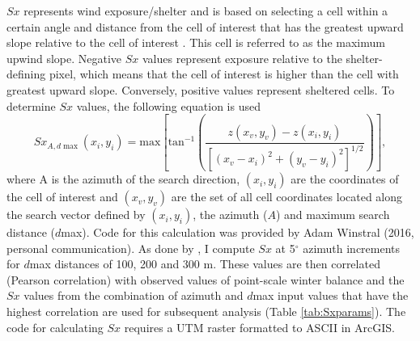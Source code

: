 \documentclass{sfuthesis}
\begin{document}
$Sx$ represents wind exposure/shelter and is based on selecting a cell within a certain angle and distance from the cell of interest that has the greatest upward slope relative to the cell of interest \citep{Winstral2002}. This cell is referred to as the maximum upwind slope. Negative $Sx$ values represent exposure relative to the shelter-defining pixel, which means that the cell of interest is higher than the cell with greatest upward slope. Conversely, positive values represent sheltered cells. To determine $Sx$ values, the following equation is used
\begin{equation}
Sx_{A, d\max}(x_i, y_i) = \textrm{max} \left[ \textrm{tan}^{-1} \left( \frac{z(x_v,y_v)-z(x_i,y_i)}{[(x_v-x_i)^2+(y_v-y_i)^2]^{1/2}} \right) \right] ,
\end{equation}
where A is the azimuth of the search direction, $(x_i, y_i)$ are the coordinates of the cell of interest and $(x_v, y_v)$ are the set of all cell coordinates located along the search vector defined by	$(x_i, y_i)$, the azimuth ($A$) and maximum search distance ($d$max). Code for this calculation was provided by Adam Winstral (2016, personal communication). As done by \cite{McGrath2015}, I compute $Sx$ at 5$^{\circ}$ azimuth increments for $d$max distances of 100, 200 and 300 m. These values are then correlated (Pearson correlation) with observed values of point-scale winter balance and the $Sx$ values from the combination of azimuth and $d$max input values that have the highest correlation are used for subsequent analysis (Table \ref{tab:Sxparams}). The code for calculating $Sx$ requires a UTM raster formatted to ASCII in ArcGIS. 
\end{document}
